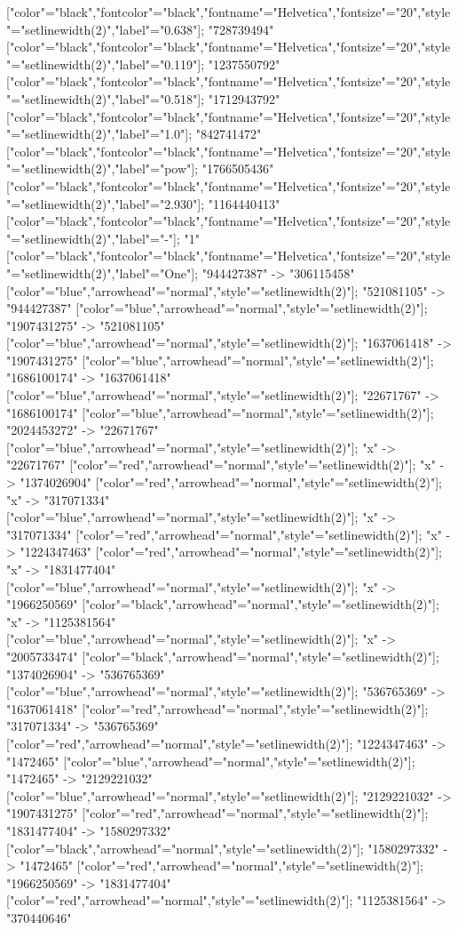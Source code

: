 ["color"="black","fontcolor"="black","fontname"="Helvetica","fontsize"="20","style"="setlinewidth(2)","label"="0.638"]; "728739494" ["color"="black","fontcolor"="black","fontname"="Helvetica","fontsize"="20","style"="setlinewidth(2)","label"="0.119"]; "1237550792" ["color"="black","fontcolor"="black","fontname"="Helvetica","fontsize"="20","style"="setlinewidth(2)","label"="0.518"]; "1712943792" ["color"="black","fontcolor"="black","fontname"="Helvetica","fontsize"="20","style"="setlinewidth(2)","label"="1.0"]; "842741472" ["color"="black","fontcolor"="black","fontname"="Helvetica","fontsize"="20","style"="setlinewidth(2)","label"="pow"]; "1766505436" ["color"="black","fontcolor"="black","fontname"="Helvetica","fontsize"="20","style"="setlinewidth(2)","label"="2.930"]; "1164440413" ["color"="black","fontcolor"="black","fontname"="Helvetica","fontsize"="20","style"="setlinewidth(2)","label"="-"]; "1" ["color"="black","fontcolor"="black","fontname"="Helvetica","fontsize"="20","style"="setlinewidth(2)","label"="One"]; "944427387" -> "306115458" ["color"="blue","arrowhead"="normal","style"="setlinewidth(2)"]; "521081105" -> "944427387" ["color"="blue","arrowhead"="normal","style"="setlinewidth(2)"]; "1907431275" -> "521081105" ["color"="blue","arrowhead"="normal","style"="setlinewidth(2)"]; "1637061418" -> "1907431275" ["color"="blue","arrowhead"="normal","style"="setlinewidth(2)"]; "1686100174" -> "1637061418" ["color"="blue","arrowhead"="normal","style"="setlinewidth(2)"]; "22671767" -> "1686100174" ["color"="blue","arrowhead"="normal","style"="setlinewidth(2)"]; "2024453272" -> "22671767" ["color"="blue","arrowhead"="normal","style"="setlinewidth(2)"]; "x" -> "22671767" ["color"="red","arrowhead"="normal","style"="setlinewidth(2)"]; "x" -> "1374026904" ["color"="red","arrowhead"="normal","style"="setlinewidth(2)"]; "x" -> "317071334" ["color"="blue","arrowhead"="normal","style"="setlinewidth(2)"]; "x" -> "317071334" ["color"="red","arrowhead"="normal","style"="setlinewidth(2)"]; "x" -> "1224347463" ["color"="red","arrowhead"="normal","style"="setlinewidth(2)"]; "x" -> "1831477404" ["color"="blue","arrowhead"="normal","style"="setlinewidth(2)"]; "x" -> "1966250569" ["color"="black","arrowhead"="normal","style"="setlinewidth(2)"]; "x" -> "1125381564" ["color"="blue","arrowhead"="normal","style"="setlinewidth(2)"]; "x" -> "2005733474" ["color"="black","arrowhead"="normal","style"="setlinewidth(2)"]; "1374026904" -> "536765369" ["color"="blue","arrowhead"="normal","style"="setlinewidth(2)"]; "536765369" -> "1637061418" ["color"="red","arrowhead"="normal","style"="setlinewidth(2)"]; "317071334" -> "536765369" ["color"="red","arrowhead"="normal","style"="setlinewidth(2)"]; "1224347463" -> "1472465" ["color"="blue","arrowhead"="normal","style"="setlinewidth(2)"]; "1472465" -> "2129221032" ["color"="blue","arrowhead"="normal","style"="setlinewidth(2)"]; "2129221032" -> "1907431275" ["color"="red","arrowhead"="normal","style"="setlinewidth(2)"]; "1831477404" -> "1580297332" ["color"="black","arrowhead"="normal","style"="setlinewidth(2)"]; "1580297332" -> "1472465" ["color"="red","arrowhead"="normal","style"="setlinewidth(2)"]; "1966250569" -> "1831477404" ["color"="red","arrowhead"="normal","style"="setlinewidth(2)"]; "1125381564" -> "370440646" 